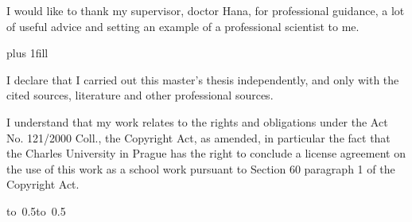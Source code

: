 \newpage



\openright
\onehalfspacing
\noindent
I would like to thank my supervisor, doctor Hana, for professional guidance, a lot of useful advice and setting an example of a professional scientist to me.

\newpage


\vglue 0pt plus 1fill

\noindent
I declare that I carried out this master's thesis independently, and only with the cited sources, literature and other professional sources.

\medskip\noindent
I understand that my work relates to the rights and obligations under the Act No. 121/2000 Coll., the Copyright Act, as amended, in particular the fact that the Charles University in Prague has the right to conclude a license agreement on the use of this work as a school work pursuant to Section 60 paragraph 1 of the Copyright Act.

\vspace{10mm}

\hbox{\hbox to 0.5\hbox to 0.5}

\vspace{20mm}
\newpage


